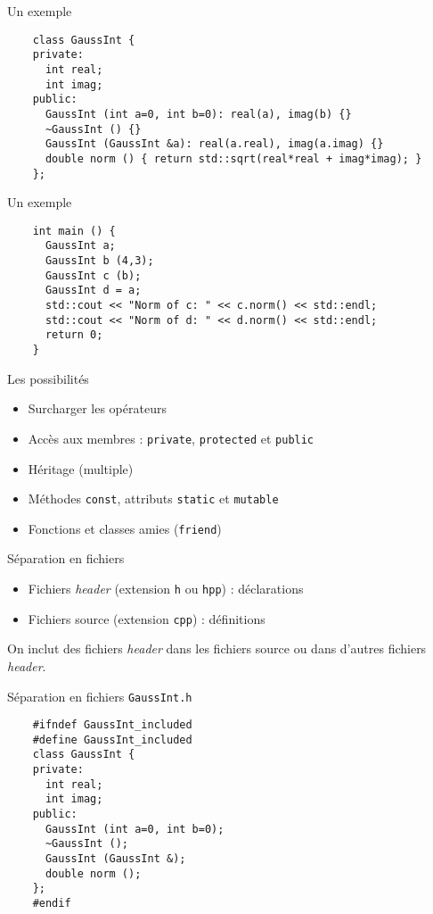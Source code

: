 \begin{frame}[fragile]{Un exemple}
  \begin{lstlisting}
    class GaussInt {
    private:
      int real;
      int imag;
    public:
      GaussInt (int a=0, int b=0): real(a), imag(b) {}
      ~GaussInt () {}
      GaussInt (GaussInt &a): real(a.real), imag(a.imag) {}
      double norm () { return std::sqrt(real*real + imag*imag); }
    };
  \end{lstlisting}
\end{frame}

\begin{frame}[fragile]{Un exemple}
  \begin{lstlisting}
    int main () {
      GaussInt a;
      GaussInt b (4,3);
      GaussInt c (b);
      GaussInt d = a;
      std::cout << "Norm of c: " << c.norm() << std::endl;
      std::cout << "Norm of d: " << d.norm() << std::endl;
      return 0;
    }
  \end{lstlisting}
\end{frame}

\begin{frame}{Les possibilités}
  \begin{itemize}
  \item Surcharger les opérateurs
  \item Accès aux membres : \texttt{private}, \texttt{protected} et \texttt{public}
  \item Héritage (multiple)
  \item Méthodes \texttt{const}, attributs \texttt{static} et \texttt{mutable}
  \item Fonctions et classes amies (\texttt{friend})
  \end{itemize}
\end{frame}

\begin{frame}{Séparation en fichiers}
  \begin{itemize}
  \item Fichiers \textit{header} (extension \texttt{h} ou \texttt{hpp}) : déclarations
  \item Fichiers source (extension \texttt{cpp}) : définitions
  \end{itemize}

  On inclut des fichiers \textit{header} dans les fichiers source ou dans d'autres fichiers \textit{header}.
\end{frame}

\begin{frame}[fragile]{Séparation en fichiers}
  \texttt{GaussInt.h}
  \begin{lstlisting}
    #ifndef GaussInt_included
    #define GaussInt_included
    class GaussInt {
    private:
      int real;
      int imag;
    public:
      GaussInt (int a=0, int b=0);
      ~GaussInt ();
      GaussInt (GaussInt &);
      double norm ();
    };
    #endif
  \end{lstlisting}
\end{frame}

